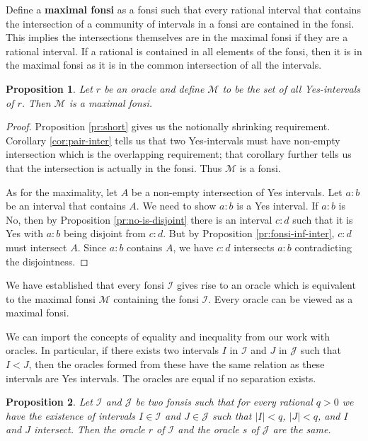 \documentclass[12pt]{article}
\newtheorem{proposition}{Proposition}[subsection]
\begin{document}
Define a \textbf{maximal fonsi} as a fonsi such that every rational interval that contains the intersection of a community of intervals in a fonsi are contained in the fonsi. This implies the intersections themselves are in the maximal fonsi if they are a rational interval. If a rational is contained in  all elements of the fonsi, then it is in the maximal fonsi as it is in the common intersection of all the intervals. 

\begin{proposition} Let $r$ be an oracle and define $\mathcal{M}$ to be the set of all Yes-intervals of $r$. Then $\mathcal{M}$ is a maximal fonsi. 
\end{proposition}

\begin{proof}
     Proposition \ref{pr:short} gives us the notionally shrinking requirement. Corollary \ref{cor:pair-inter} tells us that two Yes-intervals must have non-empty intersection which is the overlapping requirement; that corollary further tells us that the intersection is actually in the fonsi. Thus $\mathcal{M}$ is a fonsi. 

     As for the maximality, let $A$ be a non-empty intersection of Yes intervals. Let $a:b$ be an interval that contains $A$. We need to show $a:b$ is a Yes interval. If $a:b$ is No, then by Proposition \ref{pr:no-is-disjoint} there is an interval $c:d$ such that it is Yes with $a:b$ being disjoint from $c:d$. But by Proposition \ref{pr:fonsi-inf-inter}, $c:d$ must intersect $A$. Since $a:b$ contains $A$, we have $c:d$ intersects $a:b$ contradicting the disjointness. 
\end{proof}

We have established that every fonsi $\mathcal{I}$ gives rise to an oracle which is equivalent to the maximal fonsi $\mathcal{M}$ containing the fonsi $\mathcal{I}$. Every oracle can be viewed as a maximal fonsi.

We can import the concepts of equality and inequality from our work with oracles. In particular, if there exists two intervals $I$ in $\mathcal{I}$ and $J$ in $\mathcal{J}$ such that $I < J$, then the oracles formed from these have the same relation as these intervals are Yes intervals. The oracles are equal if no separation exists. 

\begin{proposition}\label{pr:fonsi-inter}
Let $\mathcal{I}$ and $\mathcal{J}$ be two fonsis such that for every rational $q>0$ we have the existence of intervals $I \in \mathcal{I}$ and $J \in \mathcal{J}$ such that $|I| <q$, $|J| < q$, and $I$ and $J$ intersect. Then the oracle $r$ of $\mathcal{I}$ and the oracle $s$ of $\mathcal{J}$ are the same. 
\end{proposition}
\end{document}
